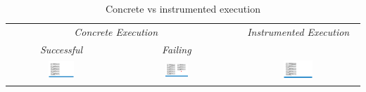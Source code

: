 \begin{table}[t!]
\centering
\renewcommand{\arraystretch}{1.2} 
{\scriptsize \begin{tabular}{@{}ccccc@{}}\toprule
\multicolumn{3}{c}{{\it Concrete Execution}} & &  \emph{Instrumented Execution}  \\
\cmidrule{1-3} \cmidrule{5-5}
\emph{Successful}  &  & \emph{Failing}  &   &       \\
\cmidrule{1-1} \cmidrule{3-3}   
{\includegraphics[width=0.25\textwidth]{figures/conc_exec.pdf}} & & 
{\includegraphics[width=0.25\textwidth]{figures/conc_wrong_exec.pdf}}  & & 
{\includegraphics[width=0.25\textwidth]{figures/inst_exec.pdf}}  \\  
\bottomrule
\end{tabular}}
\vspace{2pt}
\caption{Concrete vs instrumented execution\label{example:symb:states:vs:assertions}}
\vspace*{-0.5cm}
\end{table}

